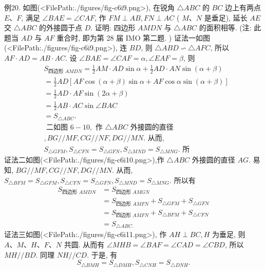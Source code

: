 例20. 如图(<FilePath:./figures/fig-c6i9.png>), 在锐角 $\triangle A B C$ 的 $B C$ 边上有两点 $E 、 F$, 满足 $\angle B A E=\angle C A F$, 作 $F M \perp A B, F N \perp A C$ ( $M 、 N$ 是垂足), 延长 $A E$ 交 $\triangle A B C$ 的外接圆于点 $D$.
证明: 四边形 $A M D N$ 与 $\triangle A B C$ 的面积相等.
 (注: 此题当 $A D$ 与 $A F$ 重合时, 即为第 28 届 IMO 第二题.
)
证法一如图(<FilePath:./figures/fig-c6i9.png>), 连 $B D$, 则 $\triangle A B D \backsim \triangle A F C$, 所以 $A F \cdot A D=A B \cdot A C$.
设 $\angle B A E=\angle C A F=\alpha, \angle E A F=\beta$, 则
$$
\begin{aligned}
& S_{\text {四边形 } A M D N}=\frac{1}{2} A M \cdot A D \sin \alpha+\frac{1}{2} A D \cdot A N \sin (\alpha+\beta) \\
&=\frac{1}{2} A D[A F \cos (\alpha+\beta) \sin \alpha+A F \cos \alpha \sin (\alpha+\beta)] \\
&=\frac{1}{2} A D \cdot A F \sin (2 \alpha+\beta) \\
&=\frac{1}{2} A B \cdot A C \sin \angle B A C \\
&=S_{\triangle A B C} . \\
& \text { 二如图 } 6-10, \text { 作 } \triangle A B C \text { 外接圆的直径 } \\
&, B G / / M F, C G / / N F, D G / / M N . \text { 从而, } \\
& S_{\triangle G F M}, S_{\triangle C F N}=S_{\triangle G F N}, S_{\triangle M N D}=S_{\triangle M N G} . \text { 所 }
\end{aligned}
$$
证法二如图(<FilePath:./figures/fig-c6i10.png>),作 $\triangle A B C$ 外接圆的直径 $A G$. 易知, $B G / / M F, C G / / N F, D G / / M N$. 从而, $S_{\triangle B F M}=S_{\triangle G F M}, S_{\triangle C F N}=S_{\triangle G F N}, S_{\triangle M N D}=S_{\triangle M N G}$. 所以有
$$
\begin{aligned}
S_{\text {四边形 } A M D N} & =S_{\text {四边形 } A M G N} \\
& =S_{\text {四边形 } A M F N}+S_{\triangle G F M}+S_{\triangle G F N} \\
& =S_{\text {四边形 } A M F N}+S_{\triangle B F M}+S_{\triangle C F N} \\
& =S_{\triangle A B C .}
\end{aligned}
$$
证法三如图(<FilePath:./figures/fig-c6i11.png>), 作 $A H \perp B C, H$ 为垂足, 则 $A 、 M 、 H 、 F 、 N$ 共圆.
从而有 $\angle M H B=\angle B A F=\angle C A D=\angle C B D$, 所以 $M H / / B D$.
同理 $N H / / C D$. 于是, 有
$$
S_{\triangle B M H}=S_{\triangle D M H}, S_{\triangle C N H}=S_{\triangle D N H} .
$$
